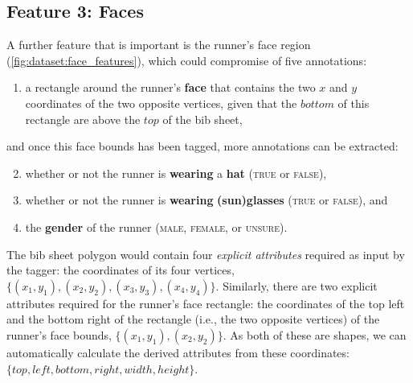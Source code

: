 \subsection{Feature 3: Faces}

A further feature that is important is the runner's face region (\cref{fig:dataset:face_features}), which could compromise of five annotations:

\begin{enumerate}
  \item a rectangle around the runner's \textbf{face} that contains the two $x$ and $y$ coordinates of the two opposite vertices, given that the $bottom$ of this rectangle are above the $top$ of the bib sheet,
\end{enumerate}

\noindent
and once this face bounds has been tagged, more annotations can be extracted:

\begin{enumerate}
  \setcounter{enumi}{1}
  \item whether or not the runner is \textbf{wearing} a \textbf{hat} (\textsc{true} or \textsc{false}),
  \item whether or not the runner is \textbf{wearing} \textbf{(sun)glasses} (\textsc{true} or \textsc{false}), and
  \item the \textbf{gender} of the runner (\textsc{male}, \textsc{female}, or \textsc{unsure}).
\end{enumerate}

The bib sheet polygon would contain four \textit{explicit attributes} required as input by the tagger: the coordinates of its four vertices, $\{ (x_{1}, y_{1}), (x_{2}, y_{2}), (x_{3}, y_{3}), (x_{4}, y_{4}) \}$. Similarly, there are two explicit attributes required for the runner's face rectangle: the coordinates of the top left and the bottom right of the rectangle (i.e., the two opposite vertices) of the runner's face bounds, $\{ (x_{1}, y_{1}), (x_{2}, y_{2}) \}$. As both of these are shapes, we can automatically calculate the derived attributes from these coordinates:  $\{ top, left, bottom, right, width, height \}$.

